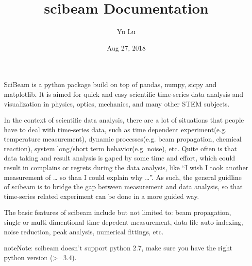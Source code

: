 \documentclass[letterpaper,10pt,english]{sphinxmanual}
\title{scibeam Documentation}
\date{Aug 27, 2018}
\author{Yu Lu}
\let\sphinxpxdimen\pdfpxdimen\else\newdimen\sphinxpxdimen
\begin{document}
\maketitle
\sphinxtableofcontents
{}\label{\detokenize{index::doc}}


\noindent{\hspace*{\fill}\sphinxincludegraphics[width=700\sphinxpxdimen]{{logo}.png}\hspace*{\fill}}
SciBeam is a python package build on top of pandas, numpy, sicpy and matplotlib. It is  aimed for quick and easy scientific time-series data analysis and visualization in physics, optics, mechanics, and many other STEM subjects.

In the context of scientific data analysis, there are a lot of situations that people have to deal with time-series data, such as time dependent experiment(e.g. temperature measurement), dynamic processes(e.g. beam propagation, chemical reaction), system long/short term behavior(e.g. noise), etc. Quite often is that data taking and result analysis is gaped by some time and effort, which could result in complains or regrets during the data analysis,  like “I wish I took another measurement of … so than I could explain why …”. As such, the general guidline of scibeam is to bridge the gap between measurement and data analysis, so that time-series related experiment can be done in a more guided way.

The basic features of scibeam include but not limited to: beam propagation, single or multi-dimentional time depedent measurement, data file auto indexing, noise reduction, peak analysis, numerical fittings, etc.

\begin{sphinxadmonition}{note}{Note:}
scibeam doesn’t support python 2.7, make sure you have the right python version (\textgreater{}=3.4).
\end{sphinxadmonition}
\end{document}
